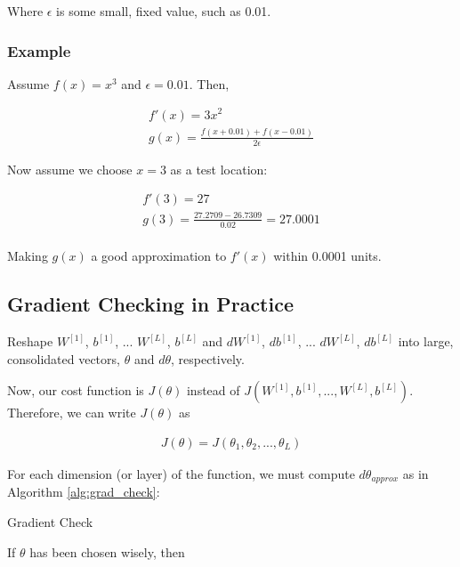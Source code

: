 \documentclass{article}
\begin{document}
Where $\epsilon$ is some small, fixed value, such as 0.01.

\subsubsection{Example}

Assume $f(x) = x^3$ and $\epsilon = 0.01$.  Then,

\begin{gather}
f'(x) = 3 x^2 \\
g(x) = \frac{f(x + 0.01) + f(x - 0.01)}{2 \epsilon}
\end{gather}

Now assume we choose $x = 3$ as a test location:

\begin{gather}
f'(3) = 27 \\
g(3) = \frac{27.2709 - 26.7309}{0.02} = 27.0001
\end{gather}
\\
Making $g(x)$ a good approximation to $f'(x)$ within 0.0001 units.

\subsection{Gradient Checking in Practice}

Reshape $W^{[1]}$, $b^{[1]}$, ... $W^{[L]}$, $b^{[L]}$ and $dW^{[1]}$, $db^{[1]}$, ... $dW^{[L]}$, $db^{[L]}$ into large, consolidated vectors, $\theta$ and $d\theta$, respectively.

Now, our cost function is $J(\theta)$ instead of $J(W^{[1]}, b^{[1]}, ..., W^{[L]}, b^{[L]})$.  Therefore, we can write $J(\theta)$ as

\begin{align}
J(\theta) = J(\theta_1, \theta_2, ..., \theta_L)
\end{align}

For each dimension (or layer) of the function, we must compute $d\theta_{approx}$ as in Algorithm \ref{alg:grad_check}:

\begin{algorithm}[h]
\caption{Gradient Check}
\label{alg:grad_check}
\end{algorithm}

If $\theta$ has been chosen wisely, then
\end{document}

